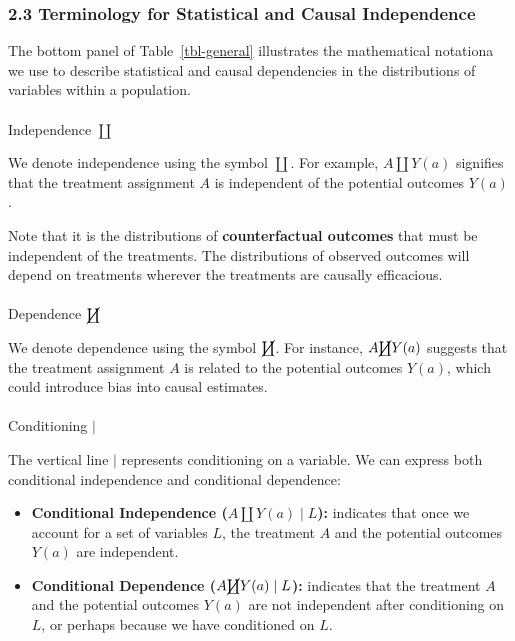 \documentclass[
  single column]{article}
\makeatletter
\let\oldparagraph\paragraph
\renewcommand{\paragraph}{
    \@ifstar
      \xxxParagraphStar
      \xxxParagraphNoStar
  }
\newcommand{\xxxParagraphStar}[1]{\oldparagraph*{#1}\mbox{}}
\newcommand{\xxxParagraphNoStar}[1]{\oldparagraph{#1}\mbox{}}
\providecommand{\tightlist}{%
  \setlength{\itemsep}{0pt}\setlength{\parskip}{0pt}}\usepackage{longtable,booktabs,array}
\makeatother
\begin{document}
\subsubsection{2.3 Terminology for Statistical and Causal
Independence}\label{terminology-for-statistical-and-causal-independence}

The bottom panel of Table~\ref{tbl-general} illustrates the mathematical
notationa we use to describe statistical and causal dependencies in the
distributions of variables within a population.

\paragraph{\texorpdfstring{Independence
\(\coprod\)}{Independence \textbackslash coprod}}\label{independence-coprod}

We denote independence using the symbol \(\coprod\). For example,
\(A \coprod Y(a)\) signifies that the treatment assignment \(A\) is
independent of the potential outcomes \(Y(a)\).

Note that it is the distributions of \textbf{counterfactual outcomes}
that must be independent of the treatments. The distributions of
observed outcomes will depend on treatments wherever the treatments are
causally efficacious.

\paragraph{\texorpdfstring{Dependence
\(\cancel{\coprod}\)}{Dependence \textbackslash cancel\{\textbackslash coprod\}}}\label{dependence-cancelcoprod}

We denote dependence using the symbol \(\cancel{\coprod}\). For
instance, \(A \cancel{\coprod} Y(a)\) suggests that the treatment
assignment \(A\) is related to the potential outcomes \(Y(a)\), which
could introduce bias into causal estimates.

\paragraph{\texorpdfstring{Conditioning
\(|\)}{Conditioning \textbar{}}}\label{conditioning}

The vertical line \(|\) represents conditioning on a variable. We can
express both conditional independence and conditional dependence:

\begin{itemize}
\tightlist
\item
  \textbf{Conditional Independence (\(A \coprod Y(a) \mid L\)):}
  indicates that once we account for a set of variables \(L\), the
  treatment \(A\) and the potential outcomes \(Y(a)\) are independent.
\item
  \textbf{Conditional Dependence (\(A \cancel{\coprod} Y(a) \mid L\)):}
  indicates that the treatment \(A\) and the potential outcomes \(Y(a)\)
  are not independent after conditioning on \(L\), or perhaps because we
  have conditioned on \(L\).
\end{itemize}
\end{document}
